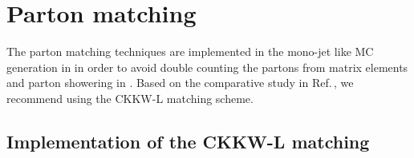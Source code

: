 \section{Parton matching}
\label{sec:monojet_parton_match}

The parton matching techniques are implemented in the mono-jet like MC generation in \madgraph in order to avoid double counting the partons from matrix elements and parton showering in \pythiaEight.
Based on the comparative study in Ref.\,\cite{Alwall:0706.2569}, we recommend using the CKKW-L matching scheme.


\subsection{Implementation of the CKKW-L matching}
\label{sec:match_implementation}

